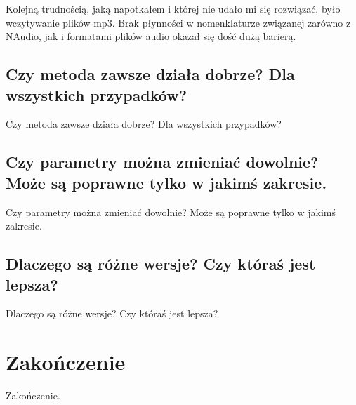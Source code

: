 \documentclass[12pt,a4paper]{article}
\begin{document}
Kolejną trudnością, jaką napotkałem i której nie udało mi się rozwiązać, było wczytywanie plików mp3. Brak płynności w nomenklaturze związanej zarówno z NAudio, jak i formatami plików audio okazał się dość dużą barierą.

\subsection{Czy metoda zawsze działa dobrze? Dla wszystkich przypadków?\label{sec:}}
Czy metoda zawsze działa dobrze? Dla wszystkich przypadków?

\subsection{Czy parametry można zmieniać dowolnie? Może są poprawne tylko w jakimś zakresie.\label{sec:}}
Czy parametry można zmieniać dowolnie? Może są poprawne tylko w jakimś zakresie.

\subsection{Dlaczego są różne wersje? Czy któraś jest lepsza?\label{sec:}}
Dlaczego są różne wersje? Czy któraś jest lepsza?

\section{Zakończenie\label{sec:zakonczenie}}
Zakończenie.



\end{document}
